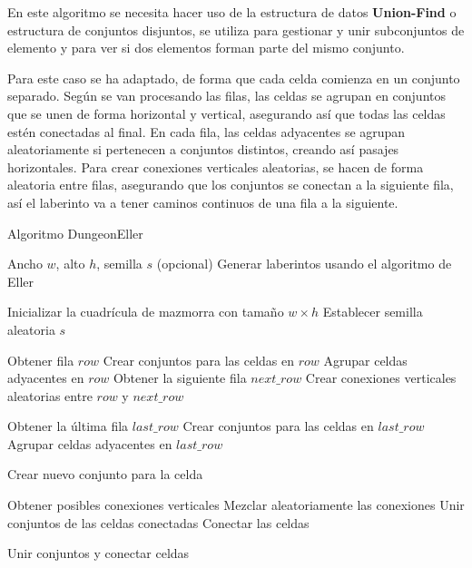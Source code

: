 En este algoritmo se necesita hacer uso de la estructura de datos \textbf{Union-Find} o estructura de conjuntos disjuntos, se utiliza para gestionar y unir subconjuntos de elemento y para ver si dos elementos forman parte del mismo conjunto.

Para este caso se ha adaptado, de forma que cada celda comienza en un conjunto separado. Según se van procesando las filas, las celdas se agrupan en conjuntos que se unen de forma horizontal y vertical, asegurando así que todas las celdas estén conectadas al final. 
En cada fila, las celdas adyacentes se agrupan aleatoriamente si pertenecen a conjuntos distintos, creando así pasajes horizontales. Para crear conexiones verticales aleatorias, se hacen de forma aleatoria entre filas, asegurando que los conjuntos se conectan a la siguiente fila, así el laberinto va a tener caminos continuos de una fila a la siguiente.

\begin{algorithm}
\caption{Algoritmo DungeonEller}
\begin{algorithmic}[1]
\Require Ancho $w$, alto $h$, semilla $s$ (opcional)
\Ensure Generar laberintos usando el algoritmo de Eller

\State Inicializar la cuadrícula de mazmorra con tamaño $w \times h$
    \State Establecer semilla aleatoria $s$
\EndIf

    \State Obtener fila $row$
    \State Crear conjuntos para las celdas en $row$
    \State Agrupar celdas adyacentes en $row$
    \State Obtener la siguiente fila $next\_row$
    \State Crear conexiones verticales aleatorias entre $row$ y $next\_row$
\EndFor

\State Obtener la última fila $last\_row$
\State Crear conjuntos para las celdas en $last\_row$
\State Agrupar celdas adyacentes en $last\_row$

            \State Crear nuevo conjunto para la celda
        \EndIf
    \EndFor
\EndProcedure

    \State Obtener posibles conexiones verticales
    \State Mezclar aleatoriamente las conexiones
        \State Unir conjuntos de las celdas conectadas
        \State Conectar las celdas
    \EndFor
\EndProcedure

            \State Unir conjuntos y conectar celdas
        \EndIf
    \EndFor
\EndProcedure

\end{algorithmic}
\end{algorithm}





